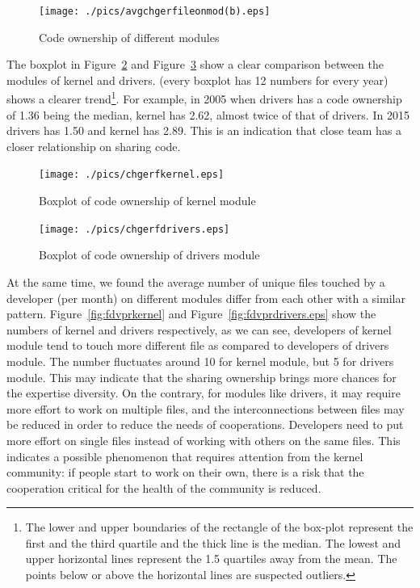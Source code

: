 \documentclass{sig-alternate-05-2015}
\begin{document}
\begin{figure}
\centering
\texttt{[image: ./pics/avgchgerfileonmod(b).eps]}
\caption{Code ownership of different modules}
\label{fig:ownership}
\end{figure}

The boxplot in Figure~\ref{fig:ownershipkernel} and Figure~\ref{fig:ownershipdrivers}
show a clear comparison between the modules of kernel and drivers.
(every boxplot has 12 numbers for every year) shows a clearer trend\footnote {The lower and
  upper boundaries of the rectangle of the box-plot represent the
  first and the third quartile and the thick line is the median. The
  lowest and upper horizontal lines represent the 1.5 quartiles away
  from the mean. The points below or above the horizontal lines are
  suspected outliers.}.
For example, in 2005 when drivers has a code ownership of 1.36 being the median,
kernel has 2.62, almost twice of that of drivers.
In 2015 drivers has 1.50 and kernel has 2.89.
This is an indication that close team has a closer relationship on
sharing code.

\begin{figure}
\centering
\texttt{[image: ./pics/chgerfkernel.eps]} %
\caption{Boxplot of code ownership of kernel module}
\label{fig:ownershipkernel}
\end{figure}

\begin{figure}
\centering
\texttt{[image: ./pics/chgerfdrivers.eps]} %
\caption{Boxplot of code ownership of drivers module}
\label{fig:ownershipdrivers}
\end{figure}

At the same time, we found the average number of unique files touched
by a developer (per month) on different modules differ from each other
with a similar pattern. Figure~\ref{fig:fdvprkernel} and
Figure~\ref{fig:fdvprdrivers.eps} show the numbers of kernel and drivers
respectively, as we can see, developers of kernel module tend to touch
more different file as compared to developers of drivers module.
The number fluctuates around 10 for kernel module, but 5 for drivers module.
This may indicate that the sharing ownership brings more chances for
the expertise diversity.
On the contrary, for modules like drivers,
 it may require more effort to work on multiple files,
and the interconnections between files may be reduced in order to reduce
the needs of cooperations.
Developers need to put more effort on single files
instead of working with others on the same files.
This indicates a possible phenomenon that requires attention from the kernel community:
if people start to work on their own, there is a risk that the cooperation critical
for the health of the community is reduced.
\end{document}
